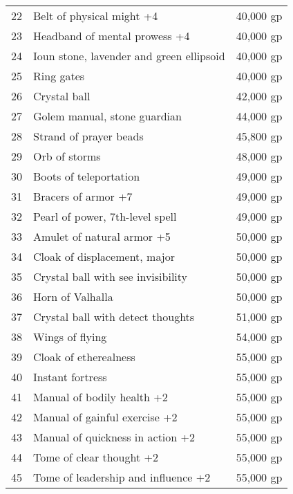 \begin{table}[]
\begin{tabularx}{\linewidth}{lXl}
22  & Belt of physical might +4                      & 40,000 gp    \\
23  & Headband of mental prowess +4                  & 40,000 gp    \\
24  & Ioun stone, lavender and green ellipsoid       & 40,000 gp    \\
25  & Ring gates                                     & 40,000 gp    \\
26  & Crystal ball                                   & 42,000 gp    \\
27  & Golem manual, stone guardian                   & 44,000 gp    \\
28  & Strand of prayer beads                         & 45,800 gp    \\
29  & Orb of storms                                  & 48,000 gp    \\
30  & Boots of teleportation                         & 49,000 gp    \\
31  & Bracers of armor +7                            & 49,000 gp    \\
32  & Pearl of power, 7th-level spell                & 49,000 gp    \\
33  & Amulet of natural armor +5                     & 50,000 gp    \\
34  & Cloak of displacement, major                   & 50,000 gp    \\
35  & Crystal ball with see invisibility             & 50,000 gp    \\
36  & Horn of Valhalla                               & 50,000 gp    \\
37  & Crystal ball with detect thoughts              & 51,000 gp    \\
38  & Wings of flying                                & 54,000 gp    \\
39  & Cloak of etherealness                          & 55,000 gp    \\
40  & Instant fortress                               & 55,000 gp    \\
41  & Manual of bodily health +2                     & 55,000 gp    \\
42  & Manual of gainful exercise +2                  & 55,000 gp    \\
43  & Manual of quickness in action +2               & 55,000 gp    \\
44  & Tome of clear thought +2                       & 55,000 gp    \\
45  & Tome of leadership and influence +2            & 55,000 gp    \\

\end{tabularx}
\end{table}
